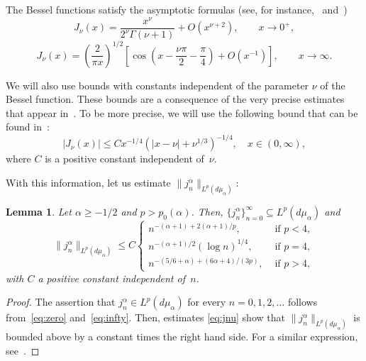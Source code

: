 \documentclass[10pt,a4paper]{article}
\newcommand{\mua}{d\mu_\alpha}
\newcommand{\jna}{j_n^{\alpha}}
\newcommand{\lpnorm}[3]{\|{#1}\|_{L^{#2}({#3})}} %
\theoremstyle{plain}
\newtheorem{lem}{Lemma}
\begin{document}
The Bessel functions satisfy the asymptotic formulas
(see, for instance,~\cite[Ch.~III, 3.1 (8), p.~40]{Wat} and~\cite[Ch.~VII, 7.21 (1),
p.~199]{Wat})
\begin{equation}
\label{eq:zero}
  J_\nu(x) = \frac{x^\nu}{2^\nu \Gamma(\nu+1)} + O(x^{\nu+2}),
    \qquad x \to 0^+,
\end{equation}
\begin{equation}
\label{eq:infty}
  J_\nu(x) = \left(\frac{2}{\pi x}\right)^{1/2}\left[ \cos\left(x-\frac{\nu\pi}2
    - \frac\pi4 \right) + O(x^{-1}) \right], \qquad x \to \infty.
\end{equation}

We will also use bounds with constants independent of the parameter $\nu$ of the Bessel function. These bounds are a consequence of the very precise estimates that appear in~\cite{BaCo}. To be more precise, we will use the following bound that can be found in~\cite{CiGPV,V}:
\begin{equation}
\label{eq:jnu}
   |J_\nu(x)| \le C x^{-1/4} \left( |x - \nu| + \nu^{1/3} \right)^{-1/4},
   \quad x \in (0,\infty),
\end{equation}
where $C$ is a positive constant independent of~$\nu$. 

With this information, let us estimate $\lpnorm{\jna}{p}{\mua}$:

\begin{lem}
\label{lem:normajn}
Let $\alpha \ge -1/2$ and $p > p_0(\alpha)$.
Then, $\{\jna\}_{n=0}^\infty \subseteq L^p(\mua)$ and
\begin{equation*}
  \lpnorm{\jna}{p}{\mua} \le C
    \begin{cases}
      n^{-(\alpha+1) + 2(\alpha+1)/p},
      &\text{ if \ } p < 4, \\[2pt]
      n^{-(\alpha+1)/2} (\log n)^{1/4},
      &\text{ if \ } p = 4, \\[2pt]
      n^{-(5/6+\alpha) + (6\alpha + 4)/(3p)},
      &\text{ if \ } p > 4,
    \end{cases}
\end{equation*}
with $C$ a positive constant independent of~$n$. 
\end{lem}

\begin{proof}
The assertion that $\jna \in L^p(\mua)$ for every $n=0,1,2,\dots$
follows from~\eqref{eq:zero} and~\eqref{eq:infty}. Then,
estimates \eqref{eq:jnu} show that $\lpnorm{\jna}{p}{\mua}$ is bounded above by a constant times the right hand side. For a similar expression, see~\cite{St-Guo}.
\end{proof}
\end{document}
